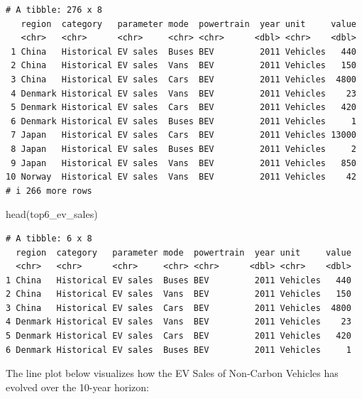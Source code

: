\documentclass[
  11pt,
  a4paper,
  DIV=11,
  numbers=noendperiod]{scrartcl}
\newenvironment{Shaded}{\begin{snugshade}}{\end{snugshade}}
\newcommand{\FunctionTok}[1]{\textcolor[rgb]{0.28,0.35,0.67}{#1}}
\newcommand{\NormalTok}[1]{\textcolor[rgb]{0.00,0.23,0.31}{#1}}
\begin{document}
\begin{verbatim}
# A tibble: 276 x 8
   region  category   parameter mode  powertrain  year unit     value
   <chr>   <chr>      <chr>     <chr> <chr>      <dbl> <chr>    <dbl>
 1 China   Historical EV sales  Buses BEV         2011 Vehicles   440
 2 China   Historical EV sales  Vans  BEV         2011 Vehicles   150
 3 China   Historical EV sales  Cars  BEV         2011 Vehicles  4800
 4 Denmark Historical EV sales  Vans  BEV         2011 Vehicles    23
 5 Denmark Historical EV sales  Cars  BEV         2011 Vehicles   420
 6 Denmark Historical EV sales  Buses BEV         2011 Vehicles     1
 7 Japan   Historical EV sales  Cars  BEV         2011 Vehicles 13000
 8 Japan   Historical EV sales  Buses BEV         2011 Vehicles     2
 9 Japan   Historical EV sales  Vans  BEV         2011 Vehicles   850
10 Norway  Historical EV sales  Vans  BEV         2011 Vehicles    42
# i 266 more rows
\end{verbatim}

\begin{Shaded}
\begin{Highlighting}[]
\FunctionTok{head}\NormalTok{(top6\_ev\_sales)}
\end{Highlighting}
\end{Shaded}

\begin{verbatim}
# A tibble: 6 x 8
  region  category   parameter mode  powertrain  year unit     value
  <chr>   <chr>      <chr>     <chr> <chr>      <dbl> <chr>    <dbl>
1 China   Historical EV sales  Buses BEV         2011 Vehicles   440
2 China   Historical EV sales  Vans  BEV         2011 Vehicles   150
3 China   Historical EV sales  Cars  BEV         2011 Vehicles  4800
4 Denmark Historical EV sales  Vans  BEV         2011 Vehicles    23
5 Denmark Historical EV sales  Cars  BEV         2011 Vehicles   420
6 Denmark Historical EV sales  Buses BEV         2011 Vehicles     1
\end{verbatim}

The line plot below visualizes how the EV Sales of Non-Carbon Vehicles
has evolved over the 10-year horizon:
\end{document}

